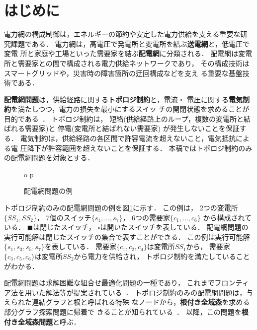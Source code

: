 ﻿\section{はじめに}\label{chap:intro}

電力網の構成制御は，エネルギーの節約や安定した電力供給を支える重要な研
究課題である．
電力網は，高電圧で発電所と変電所を結ぶ\textbf{送電網}と，低電圧で変電
所と家庭や工場といった需要家を結ぶ\textbf{配電網}に分類される．
配電網は変電所と需要家との間で構成される電力供給ネットワークであり，
その構成技術はスマートグリッドや，災害時の障害箇所の迂回構成などを支え
る重要な基盤技術である．

\textbf{配電網問題}は，供給経路に関する\textbf{トポロジ制約}と，電流・
電圧に関する\textbf{電気制約}を満たしつつ，電力の損失を最小にするスイッ
チの開閉状態を求めることが目的である~\cite{Hayashi:dnet:model}．
トポロジ制約は，
短絡(供給経路上のループ，複数の変電所と結ばれる需要家)と
停電(変電所と結ばれない需要家)
が発生しないことを保証する．
電気制約は，供給経路の各区間で許容電流を超えないこと，電気抵抗による電
圧降下が許容範囲を超えないことを保証する．
本稿ではトポロジ制約のみの配電網問題を対象とする．

\begin{figure}[htbp]
o  \centering
p  \scalebox{0.7}{}
  \caption{配電網問題の例}
  \label{fig:dnet}
\end{figure}



トポロジ制約のみの配電網問題の例を図\ref{fig:dnet}に示す．
この例は，
2つの変電所$\{SS_{1}, SS_{2}\}$，
7個のスイッチ$\{s_{1},\ldots, s_{7}\}$，
6つの需要家$\{c_{1},\ldots, c_{6}\}$
から構成されている．
$\blacksquare$は閉じたスイッチ，
$\square$は開いたスイッチを表している．
配電網問題の実行可能解は閉じたスイッチの集合で表すことができる．
この例は実行可能解$\{s_{1},s_{3},s_{5},s_{7}\}$を表している．
需要家$\{c_{1},c_{2},c_{4}\}$は変電所$SS_{1}$から，
需要家$\{c_{3},c_{5},c_{6}\}$は変電所$SS_{2}$から電力を供給され，
トポロジ制約を満たしていることがわかる．

配電網問題は求解困難な組合せ最適化問題の一種であり，
これまでフロンティア法を用いた解法等が提案されている~\cite{Minato:dnet:ZDD}．
トポロジ制約のみの配電網問題は，与えられた連結グラフと根と呼ばれる特殊
なノードから，\textbf{根付き全域森}を求める部分グラフ探索問題に帰着で
きることが知られている~\cite{Minato:dnet:netuki}．
以降，この問題を\textbf{根付き全域森問題}と呼ぶ．

